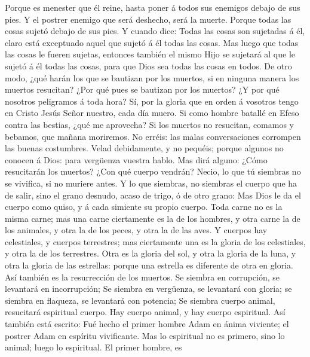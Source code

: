  Porque es menester que él reine, hasta poner á todos sus
enemigos debajo de sus pies.  Y el postrer enemigo que será
deshecho, será la muerte.  Porque todas las cosas sujetó
debajo de sus pies. Y cuando dice: Todas las cosas son sujetadas á él,
claro está exceptuado aquel que sujetó á él todas las cosas.
 Mas luego que todas las cosas le fueren sujetas, entonces
también el mismo Hijo se sujetará al que le sujetó á él todas las cosas,
para que Dios sea todas las cosas en todos.  De otro modo,
¿qué harán los que se bautizan por los muertos, si en ninguna manera los
muertos resucitan? ¿Por qué pues se bautizan por los muertos?
 ¿Y por qué nosotros peligramos á toda hora? 
Sí, por la gloria que en orden á vosotros tengo en Cristo Jesús Señor
nuestro, cada día muero.  Si como hombre batallé en Efeso
contra las bestias, ¿qué me aprovecha? Si los muertos no resucitan,
comamos y bebamos, que mañana moriremos.  No erréis: las
malas conversaciones corrompen las buenas costumbres. 
Velad debidamente, y no pequéis; porque algunos no conocen á Dios: para
vergüenza vuestra hablo.  Mas dirá alguno: ¿Cómo
resucitarán los muertos? ¿Con qué cuerpo vendrán?  Necio,
lo que tú siembras no se vivifica, si no muriere antes.  Y
lo que siembras, no siembras el cuerpo que ha de salir, sino el grano
desnudo, acaso de trigo, ó de otro grano:  Mas Dios le da
el cuerpo como quiso, y á cada simiente su propio cuerpo. 
Toda carne no es la misma carne; mas una carne ciertamente es la de los
hombres, y otra carne la de los animales, y otra la de los peces, y otra
la de las aves.  Y cuerpos hay celestiales, y cuerpos
terrestres; mas ciertamente una es la gloria de los celestiales, y otra
la de los terrestres.  Otra es la gloria del sol, y otra la
gloria de la luna, y otra la gloria de las estrellas: porque una
estrella es diferente de otra en gloria.  Así también es la
resurrección de los muertos. Se siembra en corrupción, se levantará en
incorrupción;  Se siembra en vergüenza, se levantará con
gloria; se siembra en flaqueza, se levantará con potencia; 
Se siembra cuerpo animal, resucitará espiritual cuerpo. Hay cuerpo
animal, y hay cuerpo espiritual.  Así también está escrito:
Fué hecho el primer hombre Adam en ánima viviente; el postrer Adam en
espíritu vivificante.  Mas lo espiritual no es primero,
sino lo animal; luego lo espiritual.  El primer hombre, es
